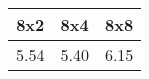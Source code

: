 \begin{tabular}{|c|c|c|}
\hline
\textbf{8x2}&\textbf{8x4}&\textbf{8x8}\\\hline
5.54&5.40&6.15\\\hline
\end{tabular}
